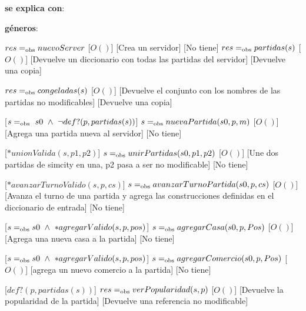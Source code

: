 \begin{Interfaz}
    \textbf{se explica con}: 

    \textbf{géneros}: 


    {$res =_{\mathrm{obs}} nuevoServer$}
    [$O()$]
    [Crea un servidor]
    [No tiene]
    {$res =_{\mathrm{obs}} partidas(s)$}
    [$O()$]
    [Devuelve un diccionario con todas las partidas del servidor]
    [Devuelve una copia]

    {$res =_{\mathrm{obs}} congeladas(s)$}
    [$O()$]
    [Devuelve el conjunto con los nombres de las partidas no modificables]
    [Devuelve una copia]

    [$s =_{\mathrm{obs}}\ s0\ \wedge\ \lnot def?(p, partidas(s))$]
    {$s =_{\mathrm{obs}} nuevaPartida(s0, p, m)$}
    [$O()$]
    [Agrega una partida nueva al servidor]
    [No tiene]

    [$*unionValida(s, p1, p2)$]
    {$s =_{\mathrm{obs}} unirPartidas(s0, p1, p2)$}
    [$O()$]
    [Une dos partidas de simcity en una, p2 pasa a ser no modificable]
    [No tiene]

    [$*avanzarTurnoValido(s, p, cs)$]
    {$s =_{\mathrm{obs}} avanzarTurnoPartida(s0, p, cs)$}
    [$O()$]
    [Avanza el turno de una partida y agrega las construcciones definidas en el diccionario de entrada]
    [No tiene]

    [$s =_{\mathrm{obs}} s0\ \wedge\ *agregarValido(s, p, pos)$]
    {$s =_{\mathrm{obs}} agregarCasa(s0, p, Pos)$}
    [$O()$]
    [Agrega una nueva casa a la partida]
    [No tiene]

    \pagebreak
    
    [$s =_{\mathrm{obs}} s0\ \wedge\ *agregarValido(s, p, pos)$]
    {$s =_{\mathrm{obs}} agregarComercio(s0, p, Pos)$}
    [$O()$]
    [agrega un nuevo comercio a la partida]
    [No tiene]
    
    [$def?(p, partidas(s))$]
    {$res =_{\mathrm{obs}} verPopularidad(s, p)$}
    [$O()$]
    [Devuelve la popularidad de la partida]
    [Devuelve una referencia no modificable]


\end{Interfaz}
